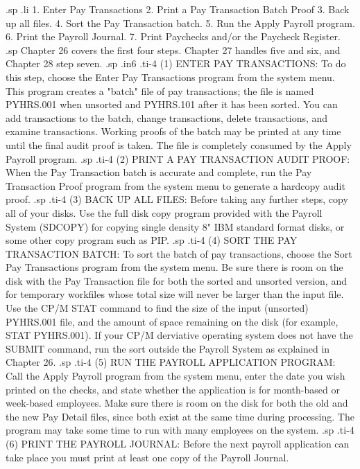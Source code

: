 .sp
.li
	   1. Enter Pay Transactions
	   2. Print a Pay Transaction Batch Proof
	   3. Back up all files.
	   4. Sort the Pay Transaction batch.
	   5. Run the Apply Payroll program.
	   6. Print the Payroll Journal.
	   7. Print Paychecks and/or the Paycheck Register.
.sp
Chapter 26 covers the first four steps.  Chapter 27 handles
five and six, and Chapter 28 step seven.
.sp
.in6
.ti-4
(1) ENTER PAY TRANSACTIONS: To do this step, choose the Enter Pay
Transactions program from the system menu.  This program creates a
"batch" file of pay transactions; the file is named PYHRS.001 when
unsorted and PYHRS.101 after it has been sorted. You can add transactions
to the
batch, change transactions, delete transactions, and examine transactions.
Working proofs of the batch may be printed at any time until the final audit
proof is taken.  The file is completely consumed by the
Apply Payroll program.
.sp
.ti-4
(2) PRINT A PAY TRANSACTION AUDIT PROOF:  When the Pay Transaction
batch is accurate and complete, run the Pay Transaction Proof program
from the system menu to generate a hardcopy audit proof.
.sp
.ti-4
(3) BACK UP ALL FILES:	Before taking any further steps, copy all of your
disks.	Use the full disk copy program provided with the Payroll System
(SDCOPY) for copying single density 8" IBM standard format disks, or
some other copy program such as PIP.
.sp
.ti-4
(4) SORT THE PAY TRANSACTION BATCH:  To sort the batch of pay transactions,
choose the Sort Pay Transactions program from the system menu.	Be sure
there is room on the disk with the Pay Transaction file for both the
sorted and unsorted version, and for temporary workfiles whose total size
will never be larger than
the input file.  Use the CP/M STAT command to find the
size of the input (unsorted) PYHRS.001 file, and the amount of space
remaining on the disk (for example, STAT PYHRS.001).
If your CP/M derviative operating system does not
have the SUBMIT command, run the sort outside the Payroll System as
explained in Chapter 26.
.sp
.ti-4
(5) RUN THE PAYROLL APPLICATION PROGRAM:  Call the Apply Payroll program
from the system menu, enter the date you wish printed on the checks, and
state whether the application is for month-based or week-based employees.
Make sure there is room on the disk for both the old and the new Pay Detail
files, since both exist at the same time during processing. The program may
take some time to run with many employees on the system.
.sp
.ti-4
(6) PRINT THE PAYROLL JOURNAL: Before the next payroll application can
take place you must print at least one copy of the Payroll Journal.
